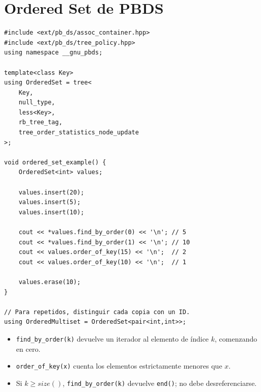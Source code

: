 \section{Ordered Set de PBDS}



\begin{lstlisting}[style=cpp]
#include <ext/pb_ds/assoc_container.hpp>
#include <ext/pb_ds/tree_policy.hpp>
using namespace __gnu_pbds;

template<class Key>
using OrderedSet = tree<
    Key,
    null_type,
    less<Key>,
    rb_tree_tag,
    tree_order_statistics_node_update
>;

void ordered_set_example() {
    OrderedSet<int> values;

    values.insert(20);
    values.insert(5);
    values.insert(10);

    cout << *values.find_by_order(0) << '\n'; // 5
    cout << *values.find_by_order(1) << '\n'; // 10
    cout << values.order_of_key(15) << '\n';  // 2
    cout << values.order_of_key(10) << '\n';  // 1

    values.erase(10);
}

// Para repetidos, distinguir cada copia con un ID.
using OrderedMultiset = OrderedSet<pair<int,int>>;
\end{lstlisting}

\begin{itemize}
  \item \texttt{find\_by\_order(k)} devuelve un iterador al elemento de
  \'indice $k$, comenzando en cero.
  \item \texttt{order\_of\_key(x)} cuenta los elementos estrictamente menores
  que $x$.
  \item Si $k\ge size()$, \texttt{find\_by\_order(k)} devuelve
  \texttt{end()}; no debe desreferenciarse.
\end{itemize}

